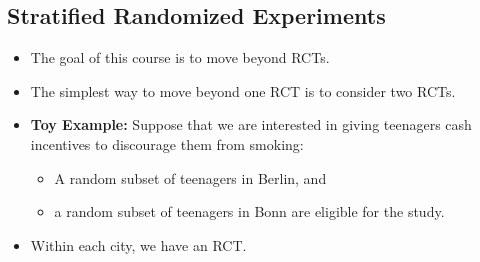 \documentclass[11pt,aspectratio=169]{beamer}
\begin{document}
\subsection{Stratified Randomized Experiments}

\begin{frame}

\begin{itemize}
    \item The goal of this course is to move beyond RCTs.
    \item The simplest way to move beyond one RCT is to consider two RCTs.
    \item \textbf{Toy Example:} Suppose that we are interested in giving teenagers cash incentives to discourage them from smoking:
    \begin{itemize}
        \item[$\blacksquare$] A random subset of teenagers in Berlin, and
        \item[$\blacksquare$] a random subset of teenagers in Bonn are eligible for the study.
    \end{itemize}
    \item Within each city, we have an RCT.
\end{itemize}

\end{frame}
\end{document}
